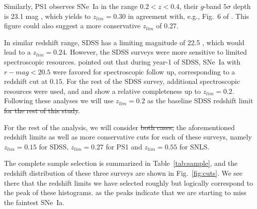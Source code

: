 \documentclass[]{aa} %
\newcommand{\nn}[1]{{\textcolor[rgb]{1, 0.27, 0}{#1}}}
\begin{document}
Similarly, PS1 observes SNe~Ia in the range $0.2<z<0.4$, their $g$-band
$5\sigma$ depth is 23.1 mag \citep{rest2014}, which yields to $z_{lim}=0.30$ in
agreement with, e.g., Fig.~6 of \cite{scolnic2018a}. This figure could also
suggest a more conservative $z_{lim}$ of 0.27.

In similar redshift range, SDSS has a limiting magnitude of
22.5 \citep{dilday2008,sako2008}, which would lead to a $z_{lim}=0.24$. However,
the SDSS surveys were more sensitive to limited spectroscopic resources.
\cite{kessler2009} \nn{pointed out} that during year-1 of SDSS, SNe~Ia with
$r-mag<20.5$ were favored for spectroscopic follow up, corresponding to a
redshift cut at $0.15$. For the rest of the SDSS survey, additional
spectroscopic resources were used, and \cite{kessler2009} and
\cite{dilday2008} show a relative completeness up to $z_{lim}=0.2$. Following
these analyses we will use $z_{lim}=0.2$ as the baseline SDSS redshift limit \sout{for
the rest of \nn{this study}}. 

For the rest of the analysis, we will consider \nn{\sout{both
cases,}} the \nn{aforementioned} redshift limits as well as more conservative cuts
for each of these surveys, namely $z_{lim}=0.15$ for SDSS, $z_{lim}=0.27$ for
PS1 and $z_{lim}=0.55$ for SNLS.

The complete sample selection is summarized in Table~\ref{tab:sample}, and the
redshift distribution of these three surveys are shown in Fig.~\ref{fig:cuts}.
We see there that the redshift limits we have selected roughly \nn{but logically}
correspond to the peak of these histograms. \nn{as the peaks indicate that we
are starting to miss the faintest SNe~Ia}.
\end{document}
